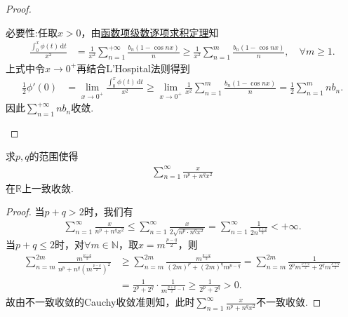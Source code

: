 \documentclass[../../main.tex]{subfiles}%
\begin{document}
\begin{proof}
\begin{enumerate}
{\heiti 必要性:}任取\( x > 0 \)，由\hyperref[theorem:函数项级数逐项求积定理]{函数项级数逐项求积定理}知
\begin{align*}
\frac{\int_{0}^{x} \phi(t) \, \mathrm{d}t}{x^2} &= \frac{1}{x^2} \sum_{n=1}^{+\infty} \frac{b_n (1 - \cos nx)}{n} \geqslant \frac{1}{x^2} \sum_{n=1}^{m} \frac{b_n (1 - \cos nx)}{n}, \quad \forall m \geqslant 1.
\end{align*}
上式中令\( x \to 0^+ \)再结合L'Hospital法则得到
\begin{align*}
\frac{1}{2} \phi'(0) &= \lim_{x \to 0^+} \frac{\int_{0}^{x} \phi(t) \, \mathrm{d}t}{x^2} \geqslant \lim_{x \to 0^+} \frac{1}{x^2} \sum_{n=1}^{m} \frac{b_n (1 - \cos nx)}{n} = \frac{1}{2} \sum_{n=1}^{m} nb_n.
\end{align*}
因此\( \sum_{n=1}^{+\infty} nb_n \)收敛.
\end{enumerate}

\end{proof}

\begin{example}
求$p,q$的范围使得
\begin{align*}
\sum_{n=1}^{\infty} \frac{x}{n^p + n^q x^2}
\end{align*}
在$\mathbb{R}$上一致收敛.
\end{example}
\begin{proof}

当$p+q>2$时，我们有
\begin{align*}
\sum_{n=1}^{\infty}{\frac{x}{n^p+n^qx^2}}\leqslant \sum_{n=1}^{\infty}{\frac{x}{2\sqrt{n^p\cdot n^qx^2}}}=\sum_{n=1}^{\infty}{\frac{1}{2n^{\frac{p+q}{2}}}}<+\infty .
\end{align*}
当$p+q\leqslant 2$时，对$\forall m\in \mathbb{N}$，取$x=m^{\frac{p-q}{2}}$，则
\begin{align*}
\sum_{n=m}^{2m}{\frac{m^{\frac{p-q}{2}}}{n^p+n^q\left( m^{\frac{p-q}{2}} \right) ^2}}&\geqslant \sum_{n=m}^{2m}{\frac{m^{\frac{p-q}{2}}}{\left( 2m \right) ^p+\left( 2m \right) ^qm^{p-q}}}=\sum_{n=m}^{2m}{\frac{1}{2^pm^{\frac{p+q}{2}}+2^qm^{\frac{p+q}{2}}}}
\\
&=\frac{1}{2^p+2^q}\cdot \frac{1}{m^{\frac{p+q}{2}-1}}\geqslant \frac{1}{2^p+2^q}>0.
\end{align*}
故由不一致收敛的Cauchy收敛准则知，此时$\sum_{n=1}^{\infty}{\frac{x}{n^p+n^qx^2}}$不一致收敛.

\end{proof}
\end{document}
